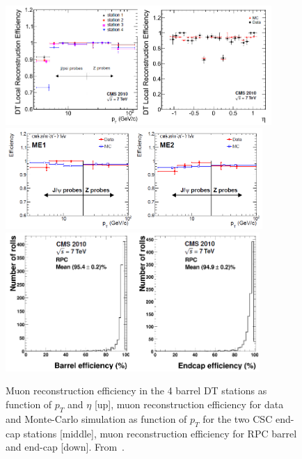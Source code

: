 \begin{figure}[!Hhtbp]
  \begin{center}
    \includegraphics[width=0.9\textwidth, height=0.3\textheight]{figs/DT_Eff.png}
    \includegraphics[width=0.87\textwidth, height=0.3\textheight]{figs/CSC_Eff.png}
    \includegraphics[width=0.86\textwidth, height=0.3\textheight]{figs/RPC_Eff.png}
    \caption{Muon reconstruction efficiency in the 4 barrel DT stations as function of $p_{T}$ and $\eta$ [up], muon reconstruction efficiency for data and Monte-Carlo simulation as function of $p_{T}$ for the two CSC end-cap stations [middle], muon reconstruction efficiency for RPC barrel and end-cap [down]. From~\cite{Chatrchyan:2013sba}.}
    \label{fig:MuonEff}
  \end{center}
\end{figure}

